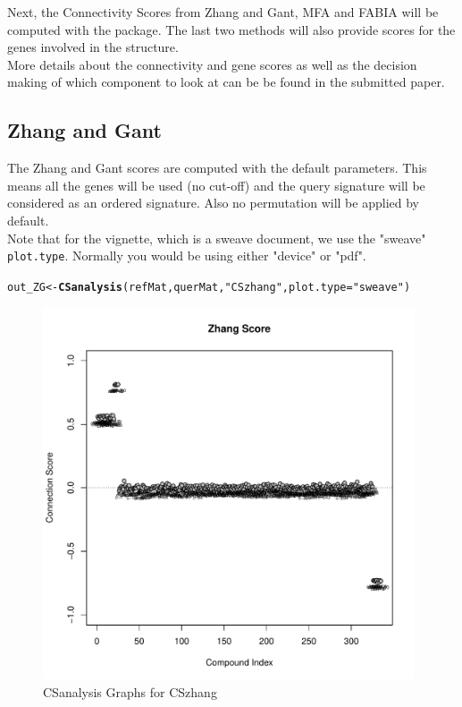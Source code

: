 \documentclass[a4paper]{article}\usepackage[]{graphicx}\usepackage[]{color}
\makeatletter
\newcommand{\hlstr}[1]{\textcolor[rgb]{0.192,0.494,0.8}{#1}}%
\newcommand{\hlstd}[1]{\textcolor[rgb]{0.345,0.345,0.345}{#1}}%
\newcommand{\hlkwb}[1]{\textcolor[rgb]{0.69,0.353,0.396}{#1}}%
\newcommand{\hlkwc}[1]{\textcolor[rgb]{0.333,0.667,0.333}{#1}}%
\newcommand{\hlkwd}[1]{\textcolor[rgb]{0.737,0.353,0.396}{\textbf{#1}}}%
\newenvironment{kframe}{%
 \def\at@end@of@kframe{}%
 \ifinner\ifhmode%
  \def\at@end@of@kframe{\end{minipage}}%
  \begin{minipage}{\columnwidth}%
 \fi\fi%
 \def\FrameCommand##1{\hskip\@totalleftmargin \hskip-\fboxsep
 \colorbox{shadecolor}{##1}\hskip-\fboxsep
     \hskip-\linewidth \hskip-\@totalleftmargin \hskip\columnwidth}%
 \MakeFramed {\advance\hsize-\width
   \@totalleftmargin\z@ \linewidth\hsize
   \@setminipage}}%
 {\par\unskip\endMakeFramed%
 \at@end@of@kframe}
\newenvironment{knitrout}{}{} %
\makeatother
\begin{document}
\noindent Next, the Connectivity Scores from Zhang and Gant, MFA and FABIA will
be computed with the package. The last two methods will also provide scores for the
genes involved in the structure.\\
More details about the connectivity and gene scores as well as the decision
making of which component to look at can be be found in the submitted paper.

\subsection{Zhang and Gant}
The Zhang and Gant scores are computed with the default parameters. This means
all the genes will be used (no cut-off) and the query signature will be
considered as an ordered signature. Also no permutation will be applied by
default.
\\Note that for the vignette, which is a
sweave document, we use the "sweave" \texttt{plot.type}. Normally you would be
using either "device" or "pdf".

\begin{knitrout}
\color{fgcolor}\begin{kframe}
\begin{alltt}
        \hlstd{out_ZG} \hlkwb{<-} \hlkwd{CSanalysis}\hlstd{(refMat,querMat,}\hlstr{"CSzhang"}\hlstd{,}\hlkwc{plot.type}\hlstd{=}\hlstr{"sweave"}\hlstd{)}
\end{alltt}
\end{kframe}\begin{figure}[H]

{\centering \includegraphics[width=11cm]{figure/ZG-1} 

}

\caption[CSanalysis Graphs for CSzhang]{CSanalysis Graphs for CSzhang}\label{fig:ZG}
\end{figure}


\end{knitrout}
\end{document}
